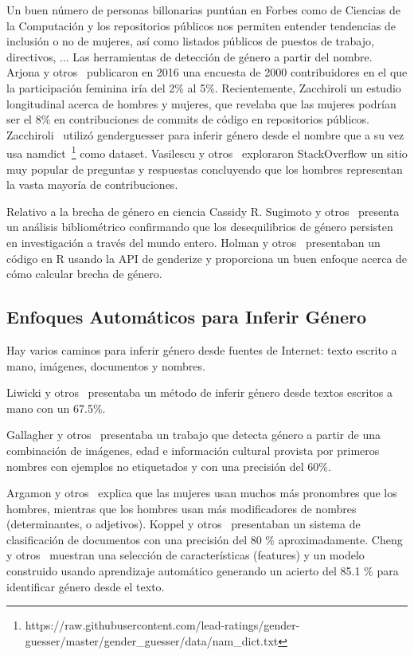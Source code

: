 \documentclass[a4paper]{article}
\begin{document}
Un buen número de personas billonarias puntúan en Forbes como de
Ciencias de la Computación y los repositorios públicos nos permiten
entender tendencias de inclusión o no de mujeres, así como listados
públicos de puestos de trabajo, directivos, ... Las herramientas de
detección de género a partir del nombre. Arjona y
otros~\cite{10.1007/978-3-319-39225-7_13} publicaron en 2016 una
encuesta de 2000 contribuidores en el que la participación feminina
iría del 2\% al 5\%. Recientemente, Zacchiroli un estudio
longitudinal acerca de hombres y mujeres, que revelaba que las
mujeres podrían ser el 8\% en contribuciones de commits de código
en repositorios públicos. Zacchiroli~\cite{zacchiroli2020gender}
utilizó genderguesser para inferir género desde el nombre que a su
vez usa namdict~\footnote{https://raw.githubusercontent.com/lead-ratings/gender-guesser/master/gender\_guesser/data/nam\_dict.txt}
como dataset. Vasilescu y otros~\cite{vasilescu2015gender}
exploraron StackOverflow un sitio muy popular de preguntas y
respuestas concluyendo que los hombres representan la vasta
mayoría de contribuciones.

Relativo a la brecha de género en ciencia Cassidy R. Sugimoto
y otros~\cite{lariviere2013bibliometrics} presenta un análisis
bibliométrico confirmando que los desequilibrios de género
persisten en investigación a través del mundo entero. Holman
y otros~\cite{holman2018gender} presentaban un código en R
usando la API de genderize y proporciona un buen enfoque
acerca de cómo calcular brecha de género.

\subsection{Enfoques Automáticos para Inferir Género}

Hay varios caminos para inferir género desde fuentes de Internet:
texto escrito a mano, imágenes, documentos y nombres.

Liwicki y otros~\cite{liwicki2011automatic} presentaba un
método de inferir género desde textos escritos a mano con
un 67.5\%.

Gallagher y otros~\cite{gallagher2008estimating} presentaba
un trabajo que detecta género a partir de una combinación de
imágenes, edad e información cultural provista por primeros
nombres con ejemplos no etiquetados y con una precisión del
60\%.

Argamon y otros~\cite{argamon2003gender} explica que las
mujeres usan muchos más pronombres que los hombres, mientras
que los hombres usan más modificadores de nombres (determinantes,
o adjetivos). Koppel y otros~\cite{koppel2002automatically}
presentaban un sistema de clasificación de documentos con una
precisión del 80 \% aproximadamente. Cheng y otros~\cite{cheng2011author}
muestran una selección de características (features) y un
modelo construido usando aprendizaje automático generando
un acierto del 85.1 \% para identificar género desde el texto.
\end{document}
